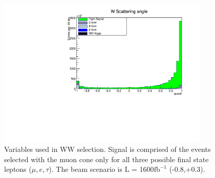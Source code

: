 \begin{figure}
\begin{minipage}{0.49\textwidth}
    \end{minipage}\hfill
    \begin{minipage}{0.49\textwidth}
        \centering
        \includegraphics[width=0.9\textwidth]{qcostHist.pdf} %
        
     \end{minipage}
          \caption{ Variables used in WW selection. Signal is comprised of the events selected with the muon cone only for all three possible final state leptons ($\mu,e,\tau$).  The beam scenario is L = 1600$\text{fb}^{-1}$ (-0.8,+0.3).}
\end{figure}

